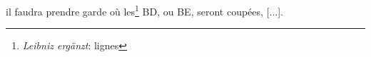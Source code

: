 \pend \pstart [p.~111] [...] il faudra prendre garde o\`{u} les\footnote{\textit{Leibniz erg\"{a}nzt}: lignes} BD, ou BE, seront coup\'{e}es, [...].